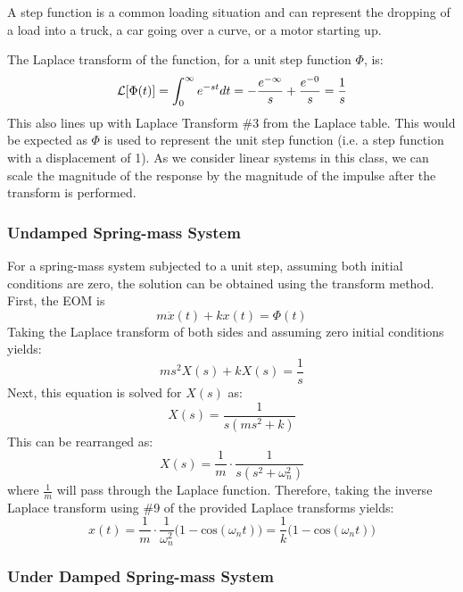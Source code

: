 \documentclass[12pt,letter]{article}
\begin{document}
A step function is a common loading situation and can represent the dropping of a load into a truck, a car going over a curve, or a motor starting up. 


The Laplace transform of the function, for a unit step function $\Phi$, is: 
\begin{equation*}
\mathcal{L}{\left[\Phi(t)\right]} = \int_{0}^{\infty} e^{-st}dt = -\frac{e^{-\infty}}{s} +\frac{e^{-0}}{s} =\frac{1}{s}
\end{equation*}
This also lines up with Laplace Transform \#3 from the Laplace table. This would be expected as $\Phi$ is used to represent the unit step function (i.e. a step function with a displacement of 1). As we consider linear systems in this class, we can scale the magnitude of the response by the magnitude of the impulse after the transform is performed. 

\subsubsection{Undamped Spring-mass System}

For a spring-mass system subjected to a unit step, assuming both initial conditions are zero, the solution can be obtained using the transform method. First, the EOM is 
\begin{equation}
m\ddot{x}(t) + kx(t) = \Phi(t)
\end{equation}
Taking the Laplace transform of both sides and assuming zero initial conditions yields:
\begin{equation}
	ms^2X(s)+kX(s) =\frac{1}{s}
\end{equation}
Next, this equation is solved for $X(s)$ as:
\begin{equation}
	X(s) = \frac{1}{s(ms^2+k)}
\end{equation}
This can be rearranged as:
\begin{equation}
	X(s) = \frac{1}{m} \cdot \frac{1}{s(s^2+\omega_n^2)}
\end{equation}
where $\frac{1}{m}$ will pass through the Laplace function. Therefore, taking the inverse Laplace transform using \#9 of the provided Laplace transforms yields:
\begin{equation}
	x(t) = \frac{1}{m} \cdot \frac{1}{\omega_n^2}\big(1-\text{cos}(\omega_n t)\big) = \frac{1}{k}\big(1-\text{cos}(\omega_n t)\big)
\end{equation}
 
\subsubsection{Under Damped Spring-mass System}
\end{document}
